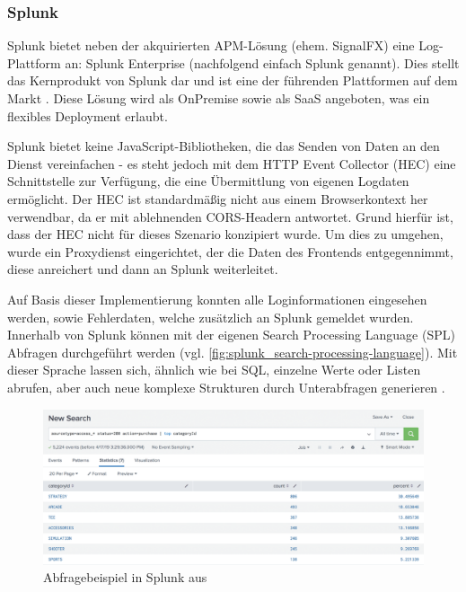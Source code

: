 \subsubsection{Splunk}
\label{subsec:splunk}

Splunk bietet neben der akquirierten APM-Lösung (ehem. SignalFX) eine Log-Plattform an: Splunk Enterprise (nachfolgend einfach Splunk genannt). Dies stellt das Kernprodukt von Splunk dar und ist eine der führenden Plattformen auf dem Markt \cite{ThreatIdentificationFromAccessLogsUsingElasticStack}. Diese Lösung wird als OnPremise sowie als SaaS angeboten, was ein flexibles Deployment erlaubt.

Splunk bietet keine JavaScript-Bibliotheken, die das Senden von Daten an den Dienst vereinfachen - es steht jedoch mit dem HTTP Event Collector (HEC) \cite{SplunkHEC} eine Schnittstelle zur Verfügung, die eine Übermittlung von eigenen Logdaten ermöglicht. Der HEC ist standardmäßig nicht aus einem Browserkontext her verwendbar, da er mit ablehnenden CORS-Headern antwortet. Grund hierfür ist, dass der HEC nicht für dieses Szenario konzipiert wurde. Um dies zu umgehen, wurde ein Proxydienst eingerichtet, der die Daten des Frontends entgegennimmt, diese anreichert und dann an Splunk weiterleitet.

Auf Basis dieser Implementierung konnten alle Loginformationen eingesehen werden, sowie Fehlerdaten, welche zusätzlich an Splunk gemeldet wurden. Innerhalb von Splunk können mit der eigenen Search Processing Language (SPL) \cite{SplunkSPL} Abfragen durchgeführt werden (vgl. \autoref{fig:splunk_search-processing-language}). Mit dieser Sprache lassen sich, ähnlich wie bei SQL, einzelne Werte oder Listen abrufen, aber auch neue komplexe Strukturen durch Unterabfragen generieren \cite{SplunkSQLtoSPL}.

\begin{figure}[H]
	\centering
	\includegraphics[width=\linewidth]{img/03_methoden/splunk_search-processing-language.png}
	\caption{Abfragebeispiel in Splunk aus \cite{SplunkSPL}}
	\label{fig:splunk_search-processing-language}
\end{figure}

